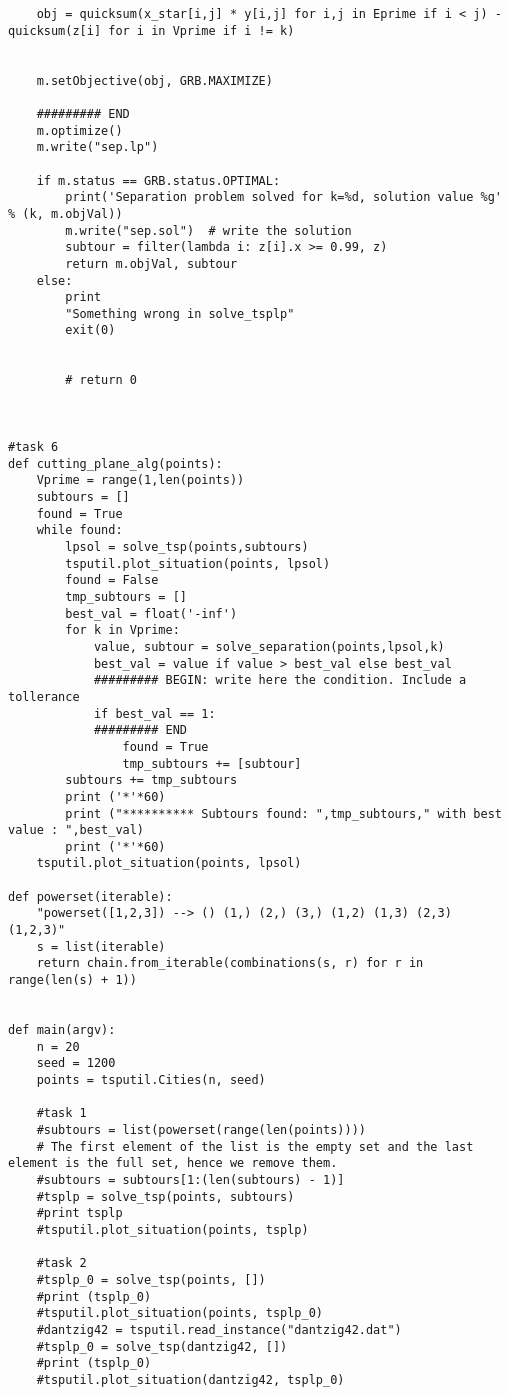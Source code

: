 \documentclass[a4paper,10pt]{article}
\begin{document}
\begin{lstlisting}
    obj = quicksum(x_star[i,j] * y[i,j] for i,j in Eprime if i < j) - quicksum(z[i] for i in Vprime if i != k)


    m.setObjective(obj, GRB.MAXIMIZE)

    ######### END
    m.optimize()
    m.write("sep.lp")

    if m.status == GRB.status.OPTIMAL:
        print('Separation problem solved for k=%d, solution value %g' % (k, m.objVal))
        m.write("sep.sol")  # write the solution
        subtour = filter(lambda i: z[i].x >= 0.99, z)
        return m.objVal, subtour
    else:
        print
        "Something wrong in solve_tsplp"
        exit(0)


        # return 0



#task 6
def cutting_plane_alg(points):
    Vprime = range(1,len(points))
    subtours = []
    found = True
    while found:
        lpsol = solve_tsp(points,subtours)
        tsputil.plot_situation(points, lpsol)
        found = False
        tmp_subtours = []
        best_val = float('-inf')
        for k in Vprime:
            value, subtour = solve_separation(points,lpsol,k)
            best_val = value if value > best_val else best_val
            ######### BEGIN: write here the condition. Include a tollerance
            if best_val == 1:
            ######### END
                found = True
                tmp_subtours += [subtour]
        subtours += tmp_subtours
        print ('*'*60)
        print ("********** Subtours found: ",tmp_subtours," with best value : ",best_val)
        print ('*'*60)
    tsputil.plot_situation(points, lpsol)

def powerset(iterable):
    "powerset([1,2,3]) --> () (1,) (2,) (3,) (1,2) (1,3) (2,3) (1,2,3)"
    s = list(iterable)
    return chain.from_iterable(combinations(s, r) for r in range(len(s) + 1))


def main(argv):
    n = 20
    seed = 1200
    points = tsputil.Cities(n, seed)

    #task 1
    #subtours = list(powerset(range(len(points))))
    # The first element of the list is the empty set and the last element is the full set, hence we remove them.
    #subtours = subtours[1:(len(subtours) - 1)]
    #tsplp = solve_tsp(points, subtours)
    #print tsplp
    #tsputil.plot_situation(points, tsplp)

    #task 2
    #tsplp_0 = solve_tsp(points, [])
    #print (tsplp_0)
    #tsputil.plot_situation(points, tsplp_0)
    #dantzig42 = tsputil.read_instance("dantzig42.dat")
    #tsplp_0 = solve_tsp(dantzig42, [])
    #print (tsplp_0)
    #tsputil.plot_situation(dantzig42, tsplp_0)


\end{lstlisting}
\end{document}
